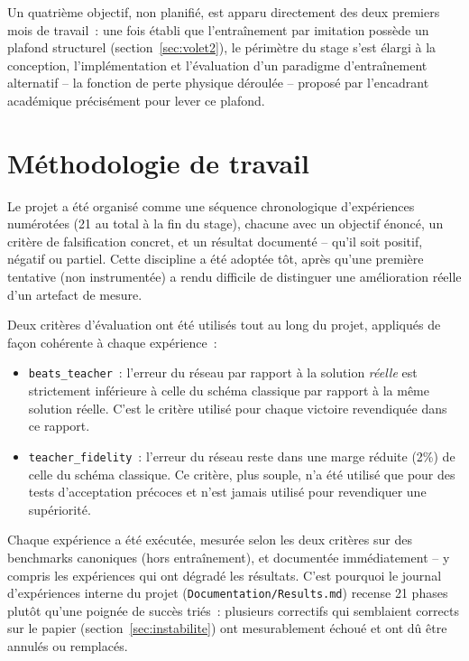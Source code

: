 \documentclass[11pt]{article}
\begin{document}
Un quatrième objectif, non planifié, est apparu directement des deux
premiers mois de travail~: une fois établi que l'entraînement par
imitation possède un plafond structurel (section~\ref{sec:volet2}), le
périmètre du stage s'est élargi à la conception, l'implémentation et
l'évaluation d'un paradigme d'entraînement alternatif -- la fonction de
perte physique déroulée -- proposé par l'encadrant académique précisément
pour lever ce plafond.

\section{Méthodologie de travail}

Le projet a été organisé comme une séquence chronologique d'expériences
numérotées (21 au total à la fin du stage), chacune avec un objectif
énoncé, un critère de falsification concret, et un résultat documenté --
qu'il soit positif, négatif ou partiel. Cette discipline a été adoptée
tôt, après qu'une première tentative (non instrumentée) a rendu difficile
de distinguer une amélioration réelle d'un artefact de mesure.

Deux critères d'évaluation ont été utilisés tout au long du projet,
appliqués de façon cohérente à chaque expérience~:

\begin{itemize}
    \item \texttt{beats\_teacher}~: l'erreur du réseau par rapport à la
    solution \emph{réelle} est strictement inférieure à celle du schéma
    classique par rapport à la même solution réelle. C'est le critère
    utilisé pour chaque victoire revendiquée dans ce rapport.
    \item \texttt{teacher\_fidelity}~: l'erreur du réseau reste dans une
    marge réduite (2\%) de celle du schéma classique. Ce critère, plus
    souple, n'a été utilisé que pour des tests d'acceptation précoces et
    n'est jamais utilisé pour revendiquer une supériorité.
\end{itemize}

Chaque expérience a été exécutée, mesurée selon les deux critères sur des
benchmarks canoniques (hors entraînement), et documentée immédiatement --
y compris les expériences qui ont dégradé les résultats. C'est pourquoi le
journal d'expériences interne du projet
(\texttt{Documentation/Results.md}) recense 21 phases plutôt qu'une
poignée de succès triés~: plusieurs correctifs qui semblaient corrects sur
le papier (section~\ref{sec:instabilite}) ont mesurablement échoué et ont
dû être annulés ou remplacés.
\end{document}
